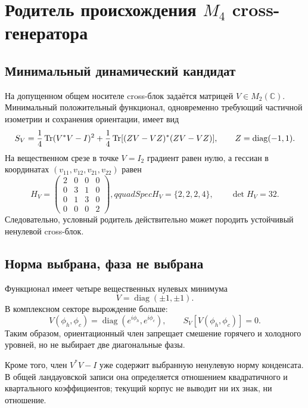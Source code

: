 \chapter{Родитель происхождения
\texorpdfstring{$M_4$}{M4} cross-генератора}
\label{ch:v10-hopf-reservoir-m4-cross-parent}

\section{Минимальный динамический кандидат}

На допущенном общем носителе cross-блок задаётся матрицей
$V\in M_2(\mathbb C)$. Минимальный положительный функционал, одновременно
требующий частичной изометрии и сохранения ориентации, имеет вид
\begin{equation}
 S_V=\frac14\operatorname{Tr}(V^*V-I)^2
 +\frac14\operatorname{Tr}[(ZV-VZ)^*(ZV-VZ)],
 \qquad Z=\operatorname{diag}(-1,1).
 \label{eq:v10-m4-cross-parent}
\end{equation}
На вещественном срезе в точке $V=I_2$ градиент равен нулю, а гессиан в
координатах $(v_{11},v_{12},v_{21},v_{22})$ равен
\begin{equation}
 H_V=\begin{pmatrix}
 2&0&0&0\\
 0&3&1&0\\
 0&1&3&0\\
 0&0&0&2
 \end{pmatrix},qquad
 Spec H_V=\{2,2,2,4\},\qquad \det H_V=32.
\end{equation}
Следовательно, условный родитель действительно может породить устойчивый
ненулевой cross-блок.

\section{Норма выбрана, фаза не выбрана}

Функционал имеет четыре вещественных нулевых минимума
\begin{equation}
 V=\operatorname{diag}(\pm1,\pm1).
\end{equation}
В комплексном секторе вырождение больше:
\begin{equation}
 V(\phi_h,\phi_c)=
 \operatorname{diag}(e^{i\phi_h},e^{i\phi_c}),\qquad
 S_V[V(\phi_h,\phi_c)]=0.
\end{equation}
Таким образом, ориентационный член запрещает смешение горячего и холодного
уровней, но не выбирает две диагональные фазы.

Кроме того, член $V^*V-I$ уже содержит выбранную ненулевую норму
конденсата. В общей ландауовской записи она определяется отношением
квадратичного и квартального коэффициентов; текущий корпус не выводит ни
их знак, ни отношение.

